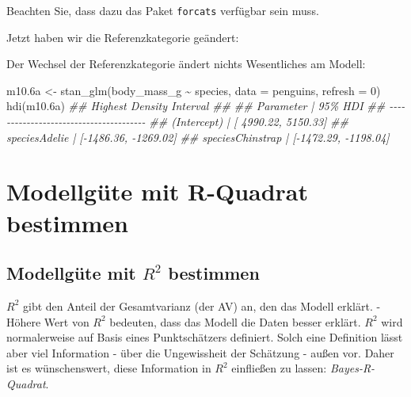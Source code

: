 \documentclass[
  a4paper,
  DIV=11]{scrreprt}
\newenvironment{Shaded}{\begin{snugshade}}{\end{snugshade}}
\newcommand{\AttributeTok}[1]{\textcolor[rgb]{0.40,0.45,0.13}{#1}}
\newcommand{\DecValTok}[1]{\textcolor[rgb]{0.68,0.00,0.00}{#1}}
\newcommand{\DocumentationTok}[1]{\textcolor[rgb]{0.37,0.37,0.37}{\textit{#1}}}
\newcommand{\FloatTok}[1]{\textcolor[rgb]{0.68,0.00,0.00}{#1}}
\newcommand{\FunctionTok}[1]{\textcolor[rgb]{0.28,0.35,0.67}{#1}}
\newcommand{\NormalTok}[1]{\textcolor[rgb]{0.00,0.23,0.31}{#1}}
\newcommand{\OtherTok}[1]{\textcolor[rgb]{0.00,0.23,0.31}{#1}}
\newcommand{\SpecialCharTok}[1]{\textcolor[rgb]{0.37,0.37,0.37}{#1}}
\theoremstyle{definition}
\theoremstyle{remark}
\begin{document}
Beachten Sie, dass dazu das Paket \texttt{forcats} verfügbar sein muss.

Jetzt haben wir die Referenzkategorie geändert:

\begin{Shaded}
\end{Shaded}

Der Wechsel der Referenzkategorie ändert nichts Wesentliches am Modell:

\begin{Shaded}
\begin{Highlighting}[]
\NormalTok{m10}\FloatTok{.6}\NormalTok{a }\OtherTok{\textless{}{-}} \FunctionTok{stan\_glm}\NormalTok{(body\_mass\_g }\SpecialCharTok{\textasciitilde{}}\NormalTok{ species, }\AttributeTok{data =}\NormalTok{ penguins, }\AttributeTok{refresh =} \DecValTok{0}\NormalTok{)}
\FunctionTok{hdi}\NormalTok{(m10}\FloatTok{.6}\NormalTok{a)}
\DocumentationTok{\#\# Highest Density Interval}
\DocumentationTok{\#\# }
\DocumentationTok{\#\# Parameter        |              95\% HDI}
\DocumentationTok{\#\# {-}{-}{-}{-}{-}{-}{-}{-}{-}{-}{-}{-}{-}{-}{-}{-}{-}{-}{-}{-}{-}{-}{-}{-}{-}{-}{-}{-}{-}{-}{-}{-}{-}{-}{-}{-}{-}{-}{-}}
\DocumentationTok{\#\# (Intercept)      | [ 4990.22,  5150.33]}
\DocumentationTok{\#\# speciesAdelie    | [{-}1486.36, {-}1269.02]}
\DocumentationTok{\#\# speciesChinstrap | [{-}1472.29, {-}1198.04]}
\end{Highlighting}
\end{Shaded}

\hypertarget{modellguxfcte-mit-r-quadrat-bestimmen}{%
\section{Modellgüte mit R-Quadrat
bestimmen}\label{modellguxfcte-mit-r-quadrat-bestimmen}}

\hypertarget{modellguxfcte-mit-r2-bestimmen}{%
\subsection{\texorpdfstring{Modellgüte mit \(R^2\)
bestimmen}{Modellgüte mit R\^{}2 bestimmen}}\label{modellguxfcte-mit-r2-bestimmen}}

\(R^2\) gibt den Anteil der Gesamtvarianz (der AV) an, den das Modell
erklärt. - Höhere Wert von \(R^2\) bedeuten, dass das Modell die Daten
besser erklärt. \(R^2\) wird normalerweise auf Basis eines
Punktschätzers definiert. Solch eine Definition lässt aber viel
Information - über die Ungewissheit der Schätzung - außen vor. Daher ist
es wünschenswert, diese Information in \(R^2\) einfließen zu lassen:
\emph{Bayes-R-Quadrat}.
\end{document}
